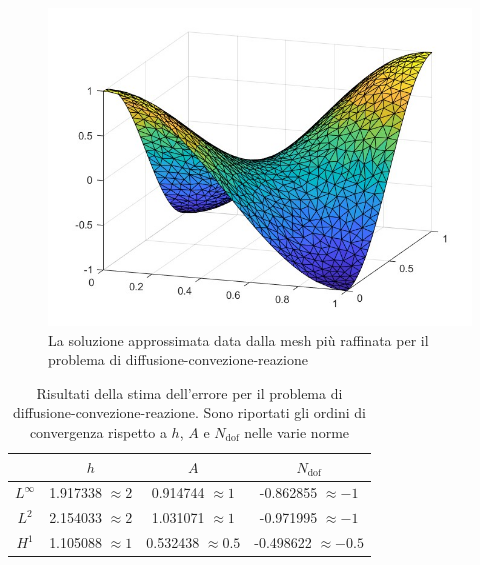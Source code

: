 \documentclass[%
	corpo=11pt,
    twoside,
    stile=classica,
    oldstyle,
    tipotesi=custom,
    greek,
    evenboxes,
]{toptesi}
\begin{document}
\begin{figure}[htbp]
    \centering
    
    \includegraphics[scale=0.4]{Pictures/grafico_funzinv.jpg}
    \caption{La soluzione approssimata data dalla mesh più raffinata per il problema di diffusione-convezione-reazione}
    \label{fig:soluzione_neumann}
  
\end{figure}



\begin{table}[htbp]
  \centering
  \begin{tabular}{|c|c|c|c|}
    \cline{2-4}
    \multicolumn{1}{c|}{} & $h$ & $A$ & $N_{\text{dof}}$ \\
    \hline
    $L^\infty$ & 1.917338  $\approx 2$ & 0.914744 $\approx 1$ & -0.862855 $\approx -1$\\
    \hline
    $L^2$ & 2.154033  $\approx 2$ & 1.031071 $\approx 1$& -0.971995 $\approx -1$\\
    \hline
    $H^1$ & 1.105088  $\approx 1$ & 0.532438 $\approx 0.5$& -0.498622 $\approx -0.5$ \\
    \hline
  \end{tabular}
  \caption{Risultati della stima dell'errore per il problema di diffusione-convezione-reazione. Sono riportati gli ordini di convergenza rispetto a $h$, $A$ e $N_{\text{dof}}$ nelle varie norme}
  \label{tab:stima_errore-neumann}
\end{table}
\end{document}
